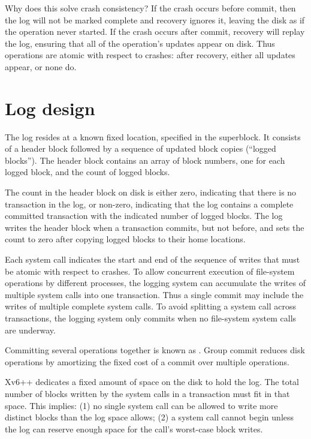 Why does this solve crash consistency? If the crash occurs before commit, then the
log will not be marked complete and recovery ignores it, leaving the disk as if the
operation never started. If the crash occurs after commit, recovery will replay the
log, ensuring that all of the operation’s updates appear on disk. Thus operations
are atomic with respect to crashes: after recovery, either all updates appear, or
none do.

\section{Log design}

The log resides at a known fixed location, specified in the superblock.
It consists of a header block followed by a sequence of updated block copies
(“logged blocks”). The header block contains an array of block numbers, one for
each logged block, and the count of logged blocks.

The count in the header block on disk is either zero, indicating that there is no
transaction in the log, or non-zero, indicating that the log contains a complete
committed transaction with the indicated number of logged blocks. The log writes
the header block when a transaction commits, but not before, and sets the count
to zero after copying logged blocks to their home locations.

Each system call indicates the start and end of the sequence of writes that must be
atomic with respect to crashes. To allow concurrent execution of file-system
operations by different processes, the logging system can accumulate the writes of
multiple system calls into one transaction. Thus a single commit may include the
writes of multiple complete system calls. To avoid splitting a system call across
transactions, the logging system only commits when no file-system system calls are
underway.

Committing several operations together is known as
.
Group commit reduces disk operations by amortizing the fixed cost of a commit over
multiple operations.

Xv6++ dedicates a fixed amount of space on the disk to hold the log. The total
number of blocks written by the system calls in a transaction must fit in that
space. This implies:
(1) no single system call can be allowed to write more distinct blocks than the log
space allows; (2) a system call cannot begin unless the log can reserve enough space
for the call’s worst-case block writes.

